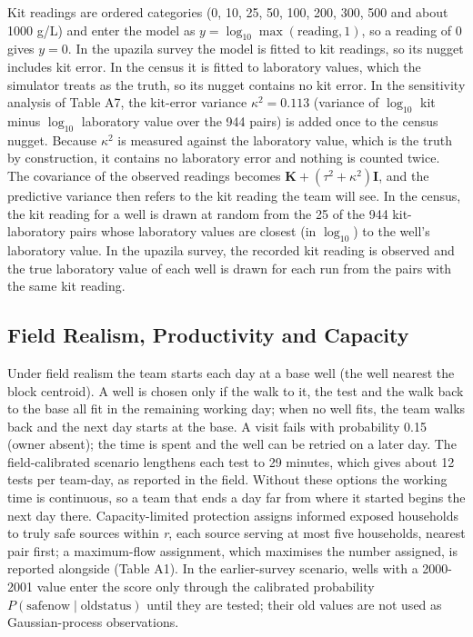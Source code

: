 \documentclass[sustainability,article,submit,pdftex,moreauthors]{Definitions/mdpi}
\begin{document}
Kit readings are ordered categories (0, 10, 25, 50, 100, 200, 300, 500 and about 1000 \textmu{}g/L) and enter the model as $y = \log_{10} \max(\mathrm{reading}, 1)$, so a reading of 0 gives $y = 0$. In the upazila survey the model is fitted to kit readings, so its nugget includes kit error. In the census it is fitted to laboratory values, which the simulator treats as the truth, so its nugget contains no kit error. In the sensitivity analysis of Table A7, the kit-error variance $\kappa^2 = 0.113$ (variance of $\log_{10}$ kit minus $\log_{10}$ laboratory value over the 944 pairs) is added once to the census nugget. Because $\kappa^2$ is measured against the laboratory value, which is the truth by construction, it contains no laboratory error and nothing is counted twice. The covariance of the observed readings becomes $\mathbf{K} + (\tau^2 + \kappa^2)\mathbf{I}$, and the predictive variance then refers to the kit reading the team will see. In the census, the kit reading for a well is drawn at random from the 25 of the 944 kit-laboratory pairs whose laboratory values are closest (in $\log_{10}$) to the well's laboratory value. In the upazila survey, the recorded kit reading is observed and the true laboratory value of each well is drawn for each run from the pairs with the same kit reading.

\subsection{Field Realism, Productivity and Capacity}

Under field realism the team starts each day at a base well (the well nearest the block centroid). A well is chosen only if the walk to it, the test and the walk back to the base all fit in the remaining working day; when no well fits, the team walks back and the next day starts at the base. A visit fails with probability 0.15 (owner absent); the time is spent and the well can be retried on a later day. The field-calibrated scenario lengthens each test to 29 minutes, which gives about 12 tests per team-day, as reported in the field. Without these options the working time is continuous, so a team that ends a day far from where it started begins the next day there. Capacity-limited protection assigns informed exposed households to truly safe sources within \textit{r}, each source serving at most five households, nearest pair first; a maximum-flow assignment, which maximises the number assigned, is reported alongside (Table A1). In the earlier-survey scenario, wells with a 2000-2001 value enter the score only through the calibrated probability $P(\mathrm{safe now} \mid \mathrm{old status})$ until they are tested; their old values are not used as Gaussian-process observations.
\end{document}
